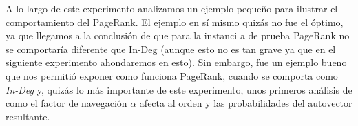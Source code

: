 \medskip
\par A lo largo de este experimento analizamos un ejemplo peque\~no para
ilustrar el comportamiento del PageRank. El ejemplo en sí mismo quizás no fue
el \'optimo, ya que llegamos a la conclusi\'on de que para la instanci  a de
prueba PageRank no se comportar\'ia diferente que In-Deg (aunque esto no es tan
grave ya que en el siguiente experimento ahondaremos en esto). Sin embargo, fue
un ejemplo bueno que nos permiti\'o exponer como funciona PageRank, cuando se
comporta como \emph{In-Deg} y, quiz\'as lo m\'as importante de este experimento,
unos primeros an\'alisis de como el factor de navegaci\'on $\alpha$ afecta al
orden y las probabilidades del autovector resultante.
